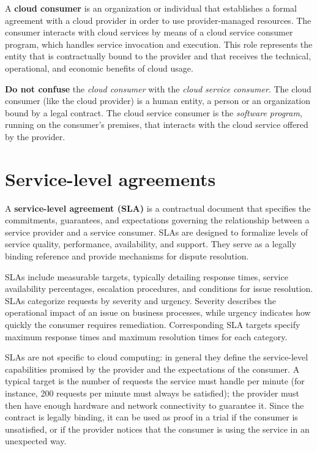 A \textbf{cloud consumer} is an organization or individual that establishes a formal agreement with a cloud provider in order to use provider-managed resources. The consumer interacts with cloud services by means of a cloud service consumer program, which handles service invocation and execution. This role represents the entity that is contractually bound to the provider and that receives the technical, operational, and economic benefits of cloud usage.

\begin{notebox}
	\textbf{Do not confuse} the \emph{cloud consumer} with the \emph{cloud service consumer}. The cloud consumer (like the cloud provider) is a human entity, a person or an organization bound by a legal contract. The cloud service consumer is the \emph{software program}, running on the consumer's premises, that interacts with the cloud service offered by the provider.
\end{notebox}

\begin{center}
\end{center}

\section{Service-level agreements}

A \textbf{service-level agreement (SLA)} is a contractual document that specifies the commitments, guarantees, and expectations governing the relationship between a service provider and a service consumer. SLAs are designed to formalize levels of service quality, performance, availability, and support. They serve as a legally binding reference and provide mechanisms for dispute resolution.

SLAs include measurable targets, typically detailing response times, service availability percentages, escalation procedures, and conditions for issue resolution. SLAs categorize requests by severity and urgency. Severity describes the operational impact of an issue on business processes, while urgency indicates how quickly the consumer requires remediation. Corresponding SLA targets specify maximum response times and maximum resolution times for each category.

SLAs are not specific to cloud computing: in general they define the service-level capabilities promised by the provider and the expectations of the consumer. A typical target is the number of requests the service must handle per minute (for instance, 200 requests per minute must always be satisfied); the provider must then have enough hardware and network connectivity to guarantee it. Since the contract is legally binding, it can be used as proof in a trial if the consumer is unsatisfied, or if the provider notices that the consumer is using the service in an unexpected way.

